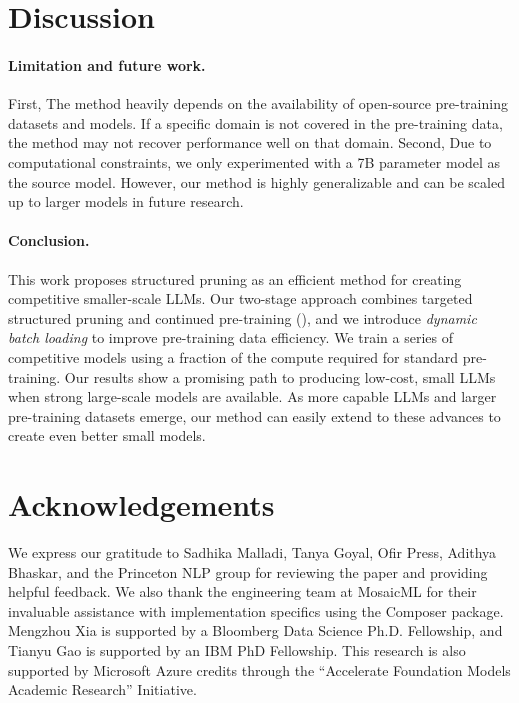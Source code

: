 \section{Discussion}
\paragraph{Limitation and future work.} First, The method heavily depends on the availability of open-source pre-training datasets and models. If a specific domain is not covered in the pre-training data, the method may not recover performance well on that domain.
Second, Due to computational constraints, we only experimented with a 7B parameter model as the source model. However, our method is highly generalizable and can be scaled up to larger models in future research.

\paragraph{Conclusion.} This work proposes structured pruning as an efficient method for creating competitive smaller-scale LLMs. Our two-stage approach combines targeted structured pruning and continued pre-training (\ct{}), and we introduce \textit{dynamic batch loading} to improve pre-training data efficiency. We train a series of competitive \ours{} models using a fraction of the compute required for standard pre-training. Our results show a promising path to producing low-cost, small LLMs when strong large-scale models are available. As more capable LLMs and larger pre-training datasets emerge, our method can easily extend to these advances to create even better small models.

\newpage
\section*{Acknowledgements}
We express our gratitude to Sadhika Malladi, Tanya Goyal, Ofir Press, Adithya Bhaskar, and the Princeton NLP group for reviewing the paper and providing helpful feedback. We also thank the engineering team at MosaicML for their invaluable assistance with implementation specifics using the Composer package. Mengzhou Xia is supported by a Bloomberg Data Science Ph.D. Fellowship, and Tianyu Gao is supported by an IBM PhD Fellowship.
This research is also supported by Microsoft Azure credits through the ``Accelerate Foundation Models Academic Research'' Initiative. 

